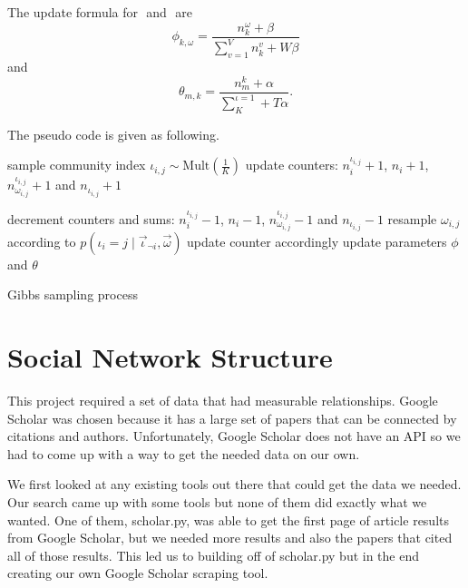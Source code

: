 \documentclass[letterpaper]{article}
\begin{document}
The update formula for $ $ and $ $ are
\begin{equation}
\phi_{k,\omega} = \frac{n^{\omega}_{k}+\beta}{\sum_{v=1}^{V}n^{v}_{k}+W\beta}
\end{equation}
and
\begin{equation}
\theta_{m,k} = \frac{n^{k}_{m}+\alpha}{\sum_{K}^{\iota=1}+T\alpha}.
\end{equation}

The pseudo code is given as following.
\begin{algorithm}
	\begin{algorithmic}[1]
		\State sample community index $ \iota_{i,j} \sim \mbox{Mult}(\frac{1}{K}) $
		\State update counters: $ n^{\iota_{i,j}}_{i} + 1 $, $ n_{i} + 1 $, $ n^{\iota_{i,j}}_{\omega_{i,j}} +1 $ and $ n_{\iota_{i,j}} +1 $
		\EndFor
		\EndFor
		
		\State decrement counters and sums:  $ n^{\iota_{i,j}}_{i} - 1 $, $ n_{i} - 1 $, $ n^{\iota_{i,j}}_{\omega_{i,j}} - 1 $ and $ n_{\iota_{i,j}} - 1 $ 
		\State resample $ \omega_{i,j} $ according to  $ p(\iota_{i}=j \mid \vec{\iota}_{\neg i}, \vec{\omega} ) $
		\State update counter accordingly
		\EndFor
		\EndFor
		\State update parameters $ \phi $ and $ \theta $
		\EndIf
		\EndWhile
	\end{algorithmic}
	\caption{Gibbs sampling process}
\end{algorithm}

\section{Social Network Structure}

This project required a set of data that had measurable relationships.
Google Scholar was chosen because it has a large set of papers that can be connected by citations and authors.
Unfortunately, Google Scholar does not have an API so we had to come up with a way to get the needed data on our own.

We first looked at any existing tools out there that could get the data we needed.
Our search came up with some tools but none of them did exactly what we wanted.
One of them, scholar.py, was able to get the first page of article results from Google Scholar, but we needed more results and also the papers that cited all of those results.
This led us to building off of scholar.py but in the end creating our own Google Scholar scraping tool.
\end{document}
